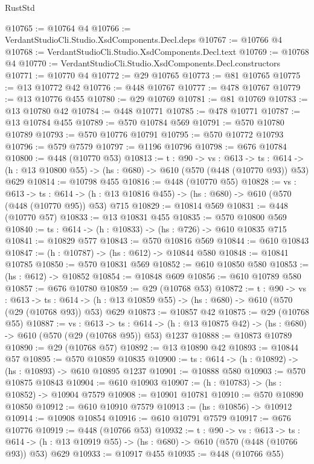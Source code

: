 \begin{lexlean}{RustStd}
\begin{coremodule}
@10765 := @10764 @4
@10766 := VerdantStudioCli.Studio.XsdComponents.Decl.deps
@10767 := @10766 @4
@10768 := VerdantStudioCli.Studio.XsdComponents.Decl.text
@10769 := @10768 @4
@10770 := VerdantStudioCli.Studio.XsdComponents.Decl.constructors
@10771 := @10770 @4
@10772 := @29 @10765
@10773 := @81 @10765
@10775 := @13 @10772 @42
@10776 := @448 @10767
@10777 := @478 @10767
@10779 := @13 @10776 @455
@10780 := @29 @10769
@10781 := @81 @10769
@10783 := @13 @10780 @42
@10784 := @448 @10771
@10785 := @478 @10771
@10787 := @13 @10784 @455
@10789 := @570 @10784 @569
@10791 := @570 @10780 @10789
@10793 := @570 @10776 @10791
@10795 := @570 @10772 @10793
@10796 := @579 @7579
@10797 := @1196 @10796
@10798 := @676 @10784
@10800 := @448 (@10770 @53)
@10813 := {t : @90} ->
  {vs : @613} ->
  {ts : @614} -> (h : @13 @10800 @55) -> (hs : @680) -> @610 (@570 (@448 (@10770 @93)) @53) @629
@10814 := @10798 @455
@10816 := @448 (@10770 @55)
@10828 := {vs : @613} ->
  {ts : @614} -> (h : @13 @10816 @455) -> (hs : @680) -> @610 (@570 (@448 (@10770 @95)) @53) @715
@10829 := @10814 @569
@10831 := @448 (@10770 @57)
@10833 := @13 @10831 @455
@10835 := @570 @10800 @569
@10840 := {ts : @614} -> (h : @10833) -> (hs : @726) -> @610 @10835 @715
@10841 := @10829 @577
@10843 := @570 @10816 @569
@10844 := @610 @10843
@10847 := (h : @10787) -> (hs : @612) -> @10844 @580
@10848 := @10841 @10785
@10850 := @570 @10831 @569
@10852 := @610 @10850 @580
@10853 := (hs : @612) -> @10852
@10854 := @10848 @609
@10856 := @610 @10789 @580
@10857 := @676 @10780
@10859 := @29 (@10768 @53)
@10872 := {t : @90} ->
  {vs : @613} ->
  {ts : @614} -> (h : @13 @10859 @55) -> (hs : @680) -> @610 (@570 (@29 (@10768 @93)) @53) @629
@10873 := @10857 @42
@10875 := @29 (@10768 @55)
@10887 := {vs : @613} ->
  {ts : @614} -> (h : @13 @10875 @42) -> (hs : @680) -> @610 (@570 (@29 (@10768 @95)) @53) @1237
@10888 := @10873 @10789
@10890 := @29 (@10768 @57)
@10892 := @13 @10890 @42
@10893 := @10844 @57
@10895 := @570 @10859 @10835
@10900 := {ts : @614} -> (h : @10892) -> (hs : @10893) -> @610 @10895 @1237
@10901 := @10888 @580
@10903 := @570 @10875 @10843
@10904 := @610 @10903
@10907 := (h : @10783) -> (hs : @10852) -> @10904 @7579
@10908 := @10901 @10781
@10910 := @570 @10890 @10850
@10912 := @610 @10910 @7579
@10913 := (hs : @10856) -> @10912
@10914 := @10908 @10854
@10916 := @610 @10791 @7579
@10917 := @676 @10776
@10919 := @448 (@10766 @53)
@10932 := {t : @90} ->
  {vs : @613} ->
  {ts : @614} -> (h : @13 @10919 @55) -> (hs : @680) -> @610 (@570 (@448 (@10766 @93)) @53) @629
@10933 := @10917 @455
@10935 := @448 (@10766 @55)

\end{coremodule}
\end{lexlean}
